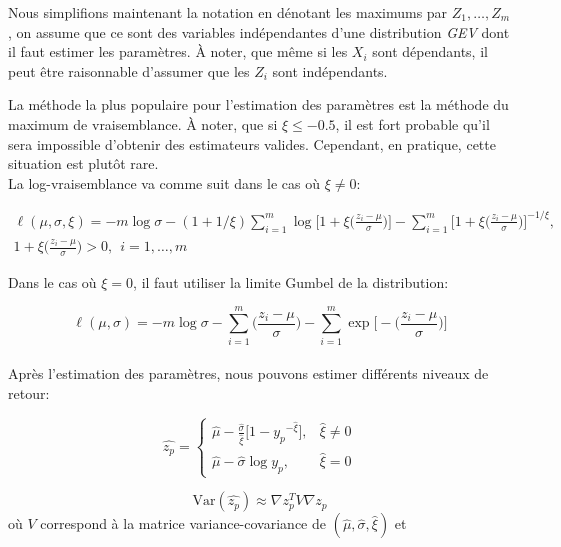 Nous simplifions maintenant la notation en dénotant les maximums par $Z_1,\dots,Z_m$, on assume que ce sont des variables indépendantes d'une distribution \textit{GEV} dont il faut estimer les paramètres. À noter, que même si les $X_i$ sont dépendants, il peut être raisonnable d'assumer que les $Z_i$ sont indépendants.

La méthode la plus populaire pour l'estimation des paramètres est la méthode du maximum de vraisemblance. À noter, que si $\xi \le -0.5$,  il est fort probable qu'il sera impossible d'obtenir des estimateurs valides. Cependant, en pratique, cette situation est plutôt rare.\\

La log-vraisemblance va comme suit dans le cas où $\xi \ne 0$:

\begin{equation}\label{eq:1.1.6}
\begin{gathered}
\ell(\mu,\sigma,\xi) = -m\log\sigma - (1+{1/\xi})\sum_{i = 1}^{m}\log\Big[1+\xi\Big(\frac{z_i- \mu}{\sigma} \Big) \Big] - 
\sum_{i = 1}^{m}\Big[1+\xi\Big(\frac{z_i- \mu}{\sigma} \Big) \Big]^{-1/\xi},\\
1+\xi\Big(\frac{z_i- \mu}{\sigma}\Big) > 0,\ \ i=1,\dots,m
\end{gathered}
\end{equation}

Dans le cas où $\xi = 0$, il faut utiliser la limite Gumbel de la distribution:

\begin{equation}\label{eq:1.1.7}
\ell(\mu,\sigma) = -m\log\sigma - \sum_{i = 1}^{m}\Big(\frac{z_i- \mu}{\sigma} \Big)  -
\sum_{i = 1}^{m}\exp\Big[-\Big(\frac{z_i- \mu}{\sigma} \Big) \Big]
\end{equation}
\\

Après l'estimation des paramètres, nous pouvons estimer différents niveaux de retour:

\begin{equation}\label{eq:1.1.8}
\hat{z_p} = 
\begin{cases}
\hat\mu - \frac{\hat\sigma}{\hat\xi}\Big[1 - {y_p}^{-\hat\xi}\Big], & \hat\xi \ne 0 \\
\hat\mu - \hat\sigma\log{y_p}, & \hat\xi = 0
\end{cases}
\end{equation}

\begin{equation}\label{eq:1.1.9}
\text{Var}(\hat{z_p}) \approx \nabla z_p^T V \nabla z_p
\end{equation}
où $V$ correspond à la matrice variance-covariance de $(\hat\mu, \hat\sigma, \hat\xi)$ et

